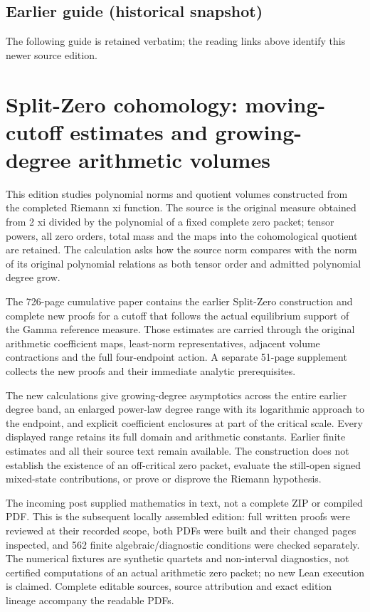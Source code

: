\documentclass[
]{article}
\begin{document}
\subsection{Earlier guide (historical
snapshot)}\label{earlier-guide-historical-snapshot-6}

The following guide is retained verbatim; the reading links above
identify this newer source edition.

\section{Split-Zero cohomology: moving-cutoff estimates and
growing-degree arithmetic
volumes}\label{split-zero-cohomology-moving-cutoff-estimates-and-growing-degree-arithmetic-volumes}

This edition studies polynomial norms and quotient volumes constructed
from the completed Riemann xi function. The source is the original
measure obtained from 2 xi divided by the polynomial of a fixed complete
zero packet; tensor powers, all zero orders, total mass and the maps
into the cohomological quotient are retained. The calculation asks how
the source norm compares with the norm of its original polynomial
relations as both tensor order and admitted polynomial degree grow.

The 726-page cumulative paper contains the earlier Split-Zero
construction and complete new proofs for a cutoff that follows the
actual equilibrium support of the Gamma reference measure. Those
estimates are carried through the original arithmetic coefficient maps,
least-norm representatives, adjacent volume contractions and the full
four-endpoint action. A separate 51-page supplement collects the new
proofs and their immediate analytic prerequisites.

The new calculations give growing-degree asymptotics across the entire
earlier degree band, an enlarged power-law degree range with its
logarithmic approach to the endpoint, and explicit coefficient
enclosures at part of the critical scale. Every displayed range retains
its full domain and arithmetic constants. Earlier finite estimates and
all their source text remain available. The construction does not
establish the existence of an off-critical zero packet, evaluate the
still-open signed mixed-state contributions, or prove or disprove the
Riemann hypothesis.

The incoming post supplied mathematics in text, not a complete ZIP or
compiled PDF. This is the subsequent locally assembled edition: full
written proofs were reviewed at their recorded scope, both PDFs were
built and their changed pages inspected, and 562 finite
algebraic/diagnostic conditions were checked separately. The numerical
fixtures are synthetic quartets and non-interval diagnostics, not
certified computations of an actual arithmetic zero packet; no new Lean
execution is claimed. Complete editable sources, source attribution and
exact edition lineage accompany the readable PDFs.
\end{document}

